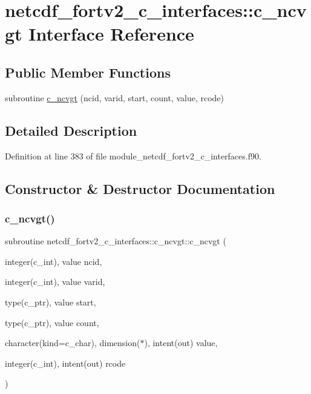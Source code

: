 \hypertarget{interfacenetcdf__fortv2__c__interfaces_1_1c__ncvgt}{}\section{netcdf\+\_\+fortv2\+\_\+c\+\_\+interfaces\+:\+:c\+\_\+ncvgt Interface Reference}
\label{interfacenetcdf__fortv2__c__interfaces_1_1c__ncvgt}
\subsection*{Public Member Functions}
\begin{DoxyCompactItemize}
\item 
subroutine \hyperlink{interfacenetcdf__fortv2__c__interfaces_1_1c__ncvgt_af194b6c8bf403ef05a539867821af0b1}{c\+\_\+ncvgt} (ncid, varid, start, count, value, rcode)
\end{DoxyCompactItemize}


\subsection{Detailed Description}


Definition at line 383 of file module\+\_\+netcdf\+\_\+fortv2\+\_\+c\+\_\+interfaces.\+f90.



\subsection{Constructor \& Destructor Documentation}
\mbox{\label{interfacenetcdf__fortv2__c__interfaces_1_1c__ncvgt_af194b6c8bf403ef05a539867821af0b1}} 
\subsubsection{\texorpdfstring{c\+\_\+ncvgt()}{c\_ncvgt()}}
{\footnotesize\ttfamily subroutine netcdf\+\_\+fortv2\+\_\+c\+\_\+interfaces\+::c\+\_\+ncvgt\+::c\+\_\+ncvgt (\begin{DoxyParamCaption}\item[{integer(c\+\_\+int), value}]{ncid,  }\item[{integer(c\+\_\+int), value}]{varid,  }\item[{type(c\+\_\+ptr), value}]{start,  }\item[{type(c\+\_\+ptr), value}]{count,  }\item[{character(kind=c\+\_\+char), dimension($\ast$), intent(out)}]{value,  }\item[{integer(c\+\_\+int), intent(out)}]{rcode }\end{DoxyParamCaption})}



